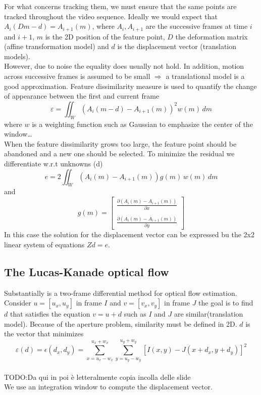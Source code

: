 For what concerns tracking them, we must ensure that the same points are tracked throughout the video sequence. 
Ideally we would expect that $A_i(Dm-d)=A_{i+1}(m)$, where $A_i, A_{i+1}$ are the successive frames at time $i$ and $i+1$, $m$ is the 2D position of the feature point, $D$ the deformation matrix (affine transformation model) and $d$ is the displacement vector (translation models).
\\ However, due to noise the equality does usually not hold. In addition, motion across successive frames is assumed to be small $\Rightarrow$ a translational model is a good approximation.
Feature dissimilarity measure is used to quantify the change of appearance between the first and current frame
\[
    \varepsilon = \iint_{W} \left(A_i(m-d)-A_{i+1}(m)\right)^2 w(m) \, dm
\]
where $w$ is a weighting function such as Gaussian to emphasize the center of the window\dots
\\When the feature dissimilarity grows too large, the feature point should be abandoned and a new one should be selected.
To minimize the residual we differentiate w.r.t unknowns (d)
\[
    e = 2 \iint_{W} \left(A_i(m)-A_{i+1}(m)\right)g(m) \, w(m) \, dm
\] 
and 
\[
    g(m)=\begin{bmatrix}
        \frac{\partial (A_i(m)-A_{i+1}(m))}{\partial x} \\
        \\
        \frac{\partial (A_i(m)-A_{i+1}(m))}{\partial y} 
    \end{bmatrix}
\]
In this case the solution for the displacement vector can be expressed bu the 2x2 linear system of equations $Zd = e$.
\subsection{The Lucas-Kanade optical flow}
Substantially is a two-frame differential method for optical flow estimation.
Consider $u=\left[u_x, u_y\right]$ in frame $I$ and $v=\left[v_x, v_y\right]$ in frame $J$ the goal is to find $d$ that satisfies the equation $v = u + d$ such as $I$ and $J$ are similar(translation model).
Because of the aperture problem, similarity must be defined in 2D.
$d$ is the vector that minimizes
\[
    \varepsilon(d) = \epsilon(d_x, d_y) = \sum_{x=u_x-w_x}^{u_x+w_x} \sum_{y=u_y-w_y}^{u_y+w_y} \left[I(x, y) - J(x+d_x, y+d_y)\right]^2
\]
\\TODO:Da qui in poi è letteralmente copia incolla delle slide\\
We use an integration window to compute the displacement vector. 


